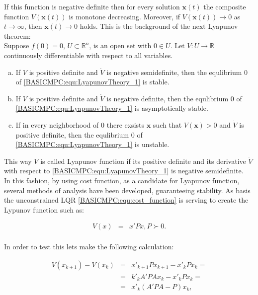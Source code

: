 		If this function is negative definite then for every solution $\boldsymbol{x}(t)$ the composite function $V(\boldsymbol{x}(t))$ is monotone decreasing. Moreover, if  $V(\boldsymbol{x}(t))\longrightarrow 0$ as $t\longrightarrow \infty$, then $\boldsymbol{x}(t)\longrightarrow 0$ holds. This is the background of the next Lyapunov theorem:\\
		Suppose $f(0)=0$, $U\subset\mathbb{R}^n$, is an open set with $0\in U$. Let $V:U\longrightarrow\mathbb{R}$ continuously differentiable with respect to all variables.
		\begin{enumerate}[a)] %
		\item If $V$ is positive definite and $\dot{V}$ is negative semidefinite, then the equlibrium $0$ of \ref{BASICMPC:equ:LyapunovTheory_1} is stable.
		\item If $V$ is positive definite and $\dot{V}$ is negative definite, then the equlibrium $0$ of \ref{BASICMPC:equ:LyapunovTheory_1} is asymptotically stable.
		\item If in every neighborhood of $0$ there exsists $\boldsymbol{x}$ such that $V(\boldsymbol{x})>0$ and $\dot{V}$ is positive definite, then the equlibrium $0$ of \ref{BASICMPC:equ:LyapunovTheory_1} is unstable.
\end{enumerate}

This way $V$ is called Lyapunov function if its positive definite and its derivative $\dot{V}$ with respect to \ref{BASICMPC:equ:LyapunovTheory_1} is negative semidefinite.\\
	In this fashion, by using cost function, as a candidate for Lyapunov function, several methods of analysis have been developed, guaranteeing stability.	As basis the unconstrained LQR \ref{BASICMPC:equ:cost_function} is serving to create the Lypunov function such as:
	
\begin{equation}
        \begin{array}{rcl}
				V(x)&=&x'Px, P\succ 0.\\
        \end{array}
        \label{BASICMPC:equ:stability_Lyapunov_1}
    \end{equation}
		
	In order to test this lets make the following calculation:
	
	\begin{equation}
        \begin{array}{rcl}
				V(x_{k+1})-V(x_{k})&=&x'_{k+1}Px_{k+1}-x'_{k}Px_{k}=\\
				&=&k'_kA'PAx_k-x'_kPx_k=\\
				&=&x'_k(A'PA-P)x_k,\\
        \end{array}
        \label{BASICMPC:equ:stability_Lyapunov_2}
    \end{equation}
		
